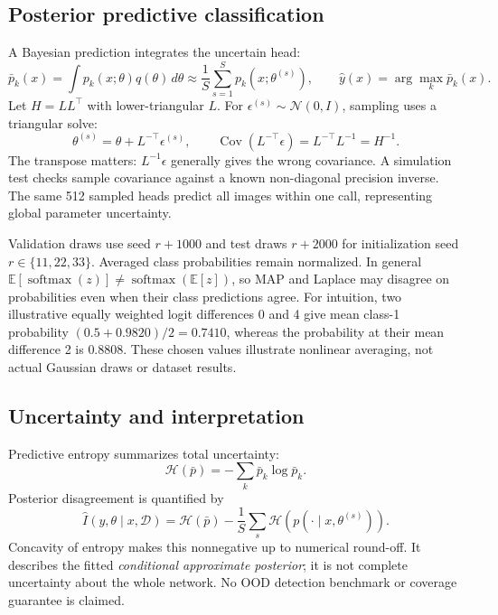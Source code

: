 \documentclass[10pt,a4paper]{article}
\newcommand{\E}{\mathbb{E}}
\begin{document}
\subsection{Posterior predictive classification}
A Bayesian prediction integrates the uncertain head:
\begin{equation}
\bar p_k(x)=\int p_k(x;\theta)q(\theta)\,d\theta
\approx \frac1S\sum_{s=1}^S p_k(x;\theta^{(s)}),\qquad
\hat y(x)=\arg\max_k\bar p_k(x).
\end{equation}
Let $H=LL^\top$ with lower-triangular $L$. For $\epsilon^{(s)}\sim\mathcal N(0,I)$,
sampling uses a triangular solve:
\begin{equation}
\theta^{(s)}=\hat\theta+L^{-\top}\epsilon^{(s)},\qquad
\operatorname{Cov}(L^{-\top}\epsilon)=
L^{-\top}L^{-1}=H^{-1}.
\end{equation}
The transpose matters: $L^{-1}\epsilon$ generally gives the wrong covariance.
A simulation test checks sample covariance against a known non-diagonal
precision inverse. The same 512 sampled heads predict all images within one
call, representing global parameter uncertainty.

Validation draws use seed $r+1000$ and test draws $r+2000$ for initialization
seed $r\in\{11,22,33\}$. Averaged class probabilities remain normalized.
In general $\E[\operatorname{softmax}(z)]\neq
\operatorname{softmax}(\E[z])$, so MAP and Laplace may disagree on probabilities
even when their class predictions agree.
For intuition, two illustrative equally weighted logit differences 0 and 4 give
mean class-1 probability $(0.5+0.9820)/2=0.7410$, whereas the probability at
their mean difference 2 is $0.8808$. These chosen values illustrate nonlinear
averaging, not actual Gaussian draws or dataset results.

\subsection{Uncertainty and interpretation}
Predictive entropy summarizes total uncertainty:
\begin{equation}
\mathcal H(\bar p)=-\sum_k\bar p_k\log\bar p_k.
\end{equation}
Posterior disagreement is quantified by
\begin{equation}\label{eq:mi}
\widehat I(y,\theta\mid x,\mathcal D)=
\mathcal H(\bar p)-\frac1S\sum_s\mathcal H(p(\cdot\mid x,\theta^{(s)})).
\end{equation}
Concavity of entropy makes this nonnegative up to numerical round-off.
It describes the fitted \emph{conditional approximate posterior}; it is not
complete uncertainty about the whole network. No OOD detection benchmark
or coverage guarantee is claimed.
\end{document}
